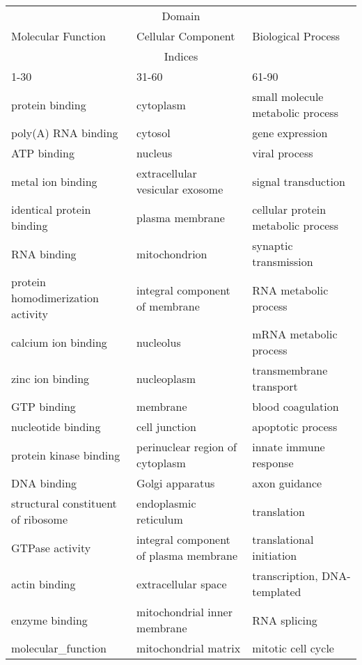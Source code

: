 \begin{table}
    \centering
    \begin{tabular}{p{} p{} p{}}
        \multicolumn{3}{c}{Domain} \\
        Molecular Function & Cellular Component & Biological Process \\
        \hline
        \multicolumn{3}{c}{Indices} \\
        1-30        & 31-60     & 61-90 \\
        \hline
        protein binding & cytoplasm & small molecule metabolic process \\
        poly(A) RNA binding & cytosol & gene expression \\
        ATP binding & nucleus & viral process \\
        metal ion binding & extracellular vesicular exosome & signal transduction \\
        identical protein binding & plasma membrane & cellular protein metabolic process \\
        RNA binding & mitochondrion & synaptic transmission \\
        protein homodimerization activity & integral component of membrane & RNA metabolic process \\
        calcium ion binding & nucleolus & mRNA metabolic process \\
        zinc ion binding & nucleoplasm & transmembrane transport \\
        GTP binding & membrane & blood coagulation \\
        nucleotide binding & cell junction & apoptotic process \\
        protein kinase binding & perinuclear region of cytoplasm & innate immune response \\
        DNA binding & Golgi apparatus & axon guidance \\
        structural constituent of ribosome & endoplasmic reticulum & translation \\
        GTPase activity & integral component of plasma membrane & translational initiation \\
        actin binding & extracellular space & transcription, DNA-templated \\
        enzyme binding & mitochondrial inner membrane & RNA splicing \\
        molecular_function & mitochondrial matrix & mitotic cell cycle \\

\end{tabular}
\end{table}
